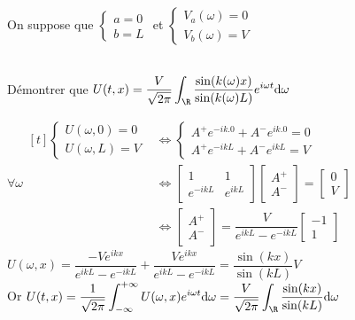 \documentclass[12pt,a4paper]{article}
\begin{document}
	\begin{exo}
		\begin{minipage}[t]{15cm}
			On suppose que $\begin{cases}
				a=0\\ b=L
			\end{cases}$ et $\begin{cases}
				V_a(\omega)=0\\ V_b(\omega) = V
			\end{cases}$
		\end{minipage}\\
		Démontrer que $U(t,x) = \dfrac V{\sqrt{2\pi}}\displaystyle\int_\R \dfrac{\sin(k(\omega)x)}{\sin(k(\omega)L)} e^{i\omega t}\mathrm d\omega$
	\end{exo}	
	\begin{sol}
		$\forall \omega \begin{aligned}[t]
			\begin{cases}
				U(\omega,0) = 0 \\
				U(\omega,L) = V
			\end{cases} &\iff \begin{cases}
				A^+e^{-ik.0}+A^-e^{ik.0} = 0 \\
				A^+e^{-ikL}+A^-e^{ikL} = V
			\end{cases}\\
			&\iff \begin{bmatrix}
				1 & 1\\
				e^{-ikL} & e^{ikL}
			\end{bmatrix}\begin{bmatrix}
				A^+\\ A^-
			\end{bmatrix} = \begin{bmatrix}
				0 \\ V
			\end{bmatrix}\\
			&\iff \begin{bmatrix}
				A^+ \\ A^-
			\end{bmatrix} = \dfrac V{e^{ikL}-e^{-ikL}}\begin{bmatrix}
				-1 \\ 1
			\end{bmatrix}
		\end{aligned}$\\
		
		$U(\omega,x) = \dfrac{-Ve^{ikx}}{e^{ikL}-e^{-ikL}} + \dfrac{Ve^{ikx}}{e^{ikL}-e^{-ikL}} = \dfrac{\sin(kx)}{\sin(kL)}V$\\
		Or $U(t,x) = \dfrac1{\sqrt{2\pi}}\displaystyle\int_{-\infty}^{+\infty} U(\omega,x) e^{i\omega t}\mathrm d\omega = \dfrac V{\sqrt{2\pi}}\displaystyle\int_\R \dfrac{\sin(kx)}{\sin(kL)}\mathrm d\omega$
	\end{sol}
	
\end{document}
